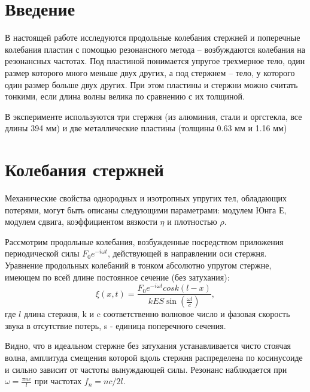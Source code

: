 \def\labauthors{Карусевич А.А., Понур К.А.}
\def\labgroup{440}
\def\labnumber{1}
\def\labtheme{Колебания механических систем \\[0.2em] с распределенными параметрами}
\def\shortlabtheme{Колебания пластин и стержней}
\def\department{Кафедра акустики}



\tableofcontents
\newpage


\section*{Введение}
\vspace{-0.5em}
В настоящей работе исследуются продольные колебания стержней и поперечные колебания пластин с помощью резонансного метода -- возбуждаются колебания на резонансных частотах. Под пластиной понимается упругое трехмерное тело, один размер которого много меньше двух других, а под стержнем -- тело, у которого один размер больше двух других. При этом пластины и стержни можно считать тонкими, если длина волны велика по сравнению с их толщиной.

В эксперименте используются три стержня (из алюминия, стали и оргстекла, все длины 394 мм) и две металлические пластины (толщины 0.63 мм и 1.16 мм)
\vspace{-0.5em}

\section*{Колебания стержней}
Механические свойства однородных и изотропных упругих тел, обладающих потерями, могут быть описаны следующими параметрами: модулем Юнга Е, модулем сдвига, коэффициентом вязкости $\eta$ и плотностью $\rho$.

Рассмотрим продольные колебания, возбужденные посредством приложения периодической силы $F_0e^{-i\omega t}$, действующей в направлении оси стержня. Уравнение продольных колебаний в тонком абсолютно упругом стержне, имеющем по всей длине постоянное сечение (без затухания):
\begin{equation}
	\xi(x,t)=\frac{F_0e^{-i\omega t}cosk(l-x)}{kES\sin(\frac{\omega l}{c})},
\end{equation}
где $l$ длина стержня, k и c соответственно волновое число и фазовая скорость звука в отсутствие потерь, s - единица поперечного сечения.

Видно, что в идеальном стержне без затухания устанавливается чисто стоячая волна, амплитуда смещения которой вдоль стержня распределена по косинусоиде и сильно зависит от частоты вынуждающей силы. Резонанс наблюдается при $\omega=\frac{\pi n c}{l}$ при частотах $f_n=nc/2l$.

